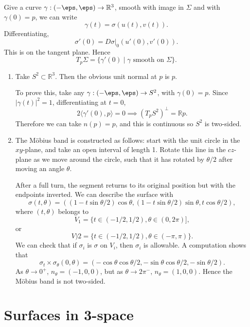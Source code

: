 \documentclass[12pt]{article}
\begin{document}
\begin{remark}
	Give a curve $\gamma : (-\eps, \eps) \to \mathbb{R}^3$, smooth with image in $\Sigma$ and with $\gamma(0) = p$, we can write
	\[
	\gamma(t) = \sigma(u(t), v(t))
	.\]
	Differentiating,
	\[
	\sigma'(0) = D\sigma|_0 (u'(0), v'(0))
	.\]
	This is on the tangent plane. Hence
	\[
		T_p\Sigma = \{\gamma'(0) \mid \gamma \text{ smooth on } \Sigma\}
	.\]
\end{remark}

\begin{exbox}
	\begin{enumerate}
		\item Take $S^2 \subset \mathbb{R}^3$. Then the obvious unit normal at $p$ is $p$.

			To prove this, take any $\gamma : (-\eps, \eps) \to S^2$, with $\gamma(0) = p$. Since $|\gamma(t)|^2 = 1$, differentiating at $t = 0$,
			\[
			2 \langle \gamma'(0), p \rangle = 0 \implies (T_p S^2)^{\perp} = \mathbb{R} p
			.\]
			Therefore we can take $n(p) = p$, and this is continuous so $S^2$ is two-sided.
		\item The M\"{o}bius band is constructed as follows: start with the unit circle in the $xy$-plane, and take an open interval of length 1. Rotate this line in the $cz$-plane as we move around the circle, such that it has rotated by $\theta/2$ after moving an angle $\theta$.

			After a full turn, the segment returns to its original position but with the endpoints inverted. We can describe the surface with
			\[
			\sigma(t, \theta) = ((1 - t \sin \theta/2)\cos \theta, (1 - t \sin \theta/2) \sin \theta, t \cos \theta/2)
			,\]
			where $(t, \theta)$ belongs to
			\[
				V_1 = \{t \in (-1/2, 1/2), \theta \in (0, 2 \pi)]
			,\]
			or
			\[
				V)2 = \{t \in (-1/2, 1/2), \theta \in (-\pi, \pi)\}
			.\]
			We can check that if $\sigma_i$ is $\sigma$ on $V_i$, then $\sigma_i$ is allowable. A computation shows that
			\[
			\sigma_{t} \times \sigma_{\theta}(0, \theta) = (- \cos \theta \cos \theta/2, - \sin \theta \cos \theta/2, - \sin \theta/2)
			.\]
			As $\theta \to 0^{+}$, $n_{\theta} = (-1, 0, 0)$, but as $\theta \to 2\pi^{-}$, $n_{\theta} = (1, 0, 0)$. Hence the M\"{o}bius band is not two-sided.
	\end{enumerate}
\end{exbox}

\newpage

\section{Surfaces in 3-space}
\label{sec:surfaces_in_3_space}
\end{document}
